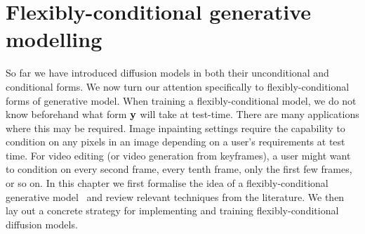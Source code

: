 \chapter{Flexibly-conditional generative modelling}
\label{ch:flexible-diffusion}

So far we have introduced diffusion models in both their unconditional and conditional forms. We now turn our attention specifically to flexibly-conditional forms of generative model. 
%
%
When training a flexibly-conditional model, we do not know beforehand what form ${\mathbf{y}}$ will take at test-time. There are many applications where this may be required. Image inpainting settings require the capability to condition on any pixels in an image depending on a user's requirements at test time. For video editing (or video generation from keyframes), a user might want to condition on every second frame, every tenth frame, only the first few frames, or so on. In this chapter we first formalise the idea of a flexibly-conditional generative model~\citep{ivanov2018variational} and review relevant techniques from the literature. We then lay out a concrete strategy for implementing and training flexibly-conditional diffusion models.


